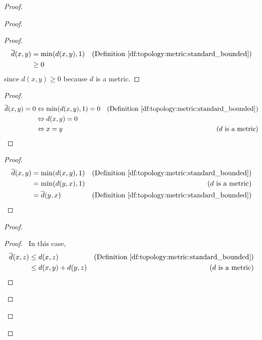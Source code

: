 \documentclass{book}
\theoremstyle{definition}
\begin{document}
  \begin{proof}
    \begin{proof}
      \begin{proof}
        \pf\ \begin{align*}
          \overline{d}(x, y) & = \min(d(x, y), 1) & (\text{Definition 
            \ref{df:topology:metric:standard_bounded}}) \\
          & \geq 0
        \end{align*}
        since $d(x, y) \geq 0$ because $d$ is a metric.
      \end{proof}
      \begin{proof}
        \pf\ \begin{align*}
          \overline{d}(x, y) = 0 & \Leftrightarrow \min(d(x, y), 1) = 0 & 
          (\text{Definition \ref{df:topology:metric:standard_bounded}}) \\
          & \Leftrightarrow d(x, y) = 0 \\
          & \Leftrightarrow x = y & (d \text{ is a metric})
        \end{align*}
      \end{proof}
      \begin{proof}
        \pf\ \begin{align*}
          \overline{d}(x, y) & = \min(d(x, y), 1) & (\text{Definition 
            \ref{df:topology:metric:standard_bounded}}) \\
          & = \min(d(y, x), 1) & (d \text{ is a metric}) \\
          & = \overline{d}(y, x) & (\text{Definition 
            \ref{df:topology:metric:standard_bounded}})
        \end{align*}
      \end{proof}
      \begin{proof}
        \begin{proof}
          \pf\ In this case,
          \begin{align*}
            \overline{d}(x, z) & \leq d(x, z) & (\text{Definition 
              \ref{df:topology:metric:standard_bounded}}) \\
            & \leq d(x, y) + d(y, z) & (d \text{ is a metric}) \\

\end{align*}
\end{proof}
\end{proof}
\end{proof}
\end{proof}
\end{document}
